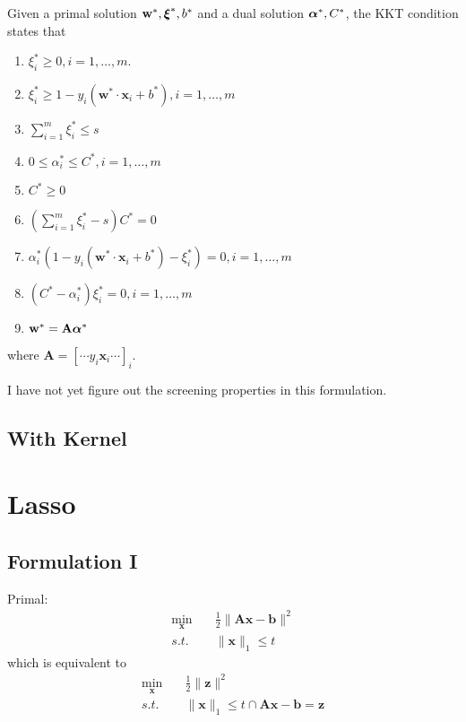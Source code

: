 \documentclass[
10pt, %
a4paper, %
oneside, %
headinclude,footinclude, %
BCOR5mm, %
]{scrartcl}
\newcommand{\AB}{\mathbf{A}}
\newcommand{\bB}{\mathbf{b}}
\newcommand{\wB}{\mathbf{w}}
\newcommand{\xB}{\mathbf{x}}
\newcommand{\zB}{\mathbf{z}}
\newcommand{\xiB}{\mbox{\boldmath$\xi$\unboldmath}}
\newcommand{\alphaB}{\mbox{\boldmath$\alpha$\unboldmath}}
\begin{document}
Given a primal solution $\wB^*, \xiB^*, b^*$ and a dual solution $\alphaB^*, C^*$, the KKT condition states that 
\begin{enumerate}
	\item $\xi^*_i \geq 0, i = 1, \ldots, m$.
	\item $\xi^*_i \geq 1 - y_i(\wB^*\cdot\xB_i+b^*), i = 1, \ldots, m$
	\item $\sum_{i=1}^m \xi^*_i \leq s$
	\item $0 \leq \alpha^*_i \leq C^*, i = 1, \ldots, m$
	\item $C^* \geq 0$
	\item $(\sum_{i=1}^m \xi^*_i - s) C^* = 0$
	\item $\alpha^*_i (1 - y_i(\wB^*\cdot\xB_i+b^*) - \xi^*_i) =0, i = 1, \ldots, m$
	\item $(C^* - \alpha^*_i) \xi^*_i = 0, i = 1, \ldots, m$
	\item $\wB^* = \AB \alphaB^*$
\end{enumerate}
where $\AB = [\cdots y_i\xB_i \cdots]_i$.

I have not yet figure out the screening properties in this formulation.
\subsection{With Kernel}


\section{Lasso}
\subsection{Formulation I}
Primal:
\begin{equation}
	\begin{aligned}
		\min_\xB & \quad \frac{1}{2}\|\AB\xB - \bB\|^2 \\
		s.t. & \quad \|\xB\|_1 \leq t
	\end{aligned}
\end{equation}
which is equivalent to 
\begin{equation}
	\begin{aligned}
		\min_\xB & \quad \frac{1}{2}\|\zB\|^2 \\
		s.t. & \quad \|\xB\|_1 \leq t \cap \AB\xB - \bB = \zB
	\end{aligned}
	\label{eqn: Lasso constrain auxillary variable I}
\end{equation}
\end{document}

